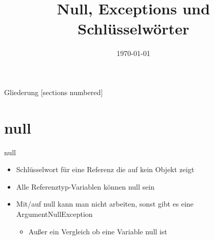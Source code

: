 



\title{Null, Exceptions und Schlüsselwörter}
\date{\today}




\maketitle

\begin{frame}{Gliederung}
	[sections numbered]
	\tableofcontents
\end{frame}

\section{null}
\begin{frame}{null}
	\begin{itemize}
		\item Schlüsselwort für eine Referenz die auf kein Objekt zeigt
		\item Alle Referenztyp-Variablen können \alert{null} sein
		\item Mit/auf \alert{null} kann man nicht arbeiten, sonst gibt es eine ArgumentNullException
		\begin{itemize}
			\item Außer ein Vergleich ob eine Variable \alert{null} ist
		\end{itemize}
	\end{itemize}
		
\end{frame}

